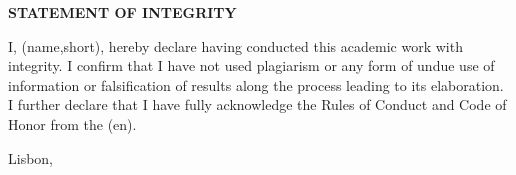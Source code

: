 
%

\thispagestyle{empty}

\begingroup
\setlength{\parskip}{1ex plus 1pt minus 1pt}
\setlength{\parindent}{0cm}
\begin{center}
  \textbf{STATEMENT OF INTEGRITY}
\end{center}

I, \thedocauthor(name,short), hereby declare having conducted this academic work with integrity.
I confirm that I have not used plagiarism or any form of undue use of information or falsification of results along the process leading to its elaboration.
I further declare that I have fully acknowledge the Rules of Conduct and Code of Honor from the \theschool(en).

\bigskip


Lisbon, 

\endgroup
\clearforchapter

